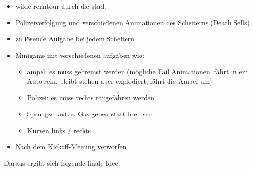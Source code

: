 \begin{enumerate}
	\begin{itemize}
		\item wilde renntour durch die stadt
		\item Polizeiverfolgung und verschiedenen Animationen des Scheiterns (Death Sells)
		\item zu lösende Aufgabe bei jedem Scheitern
		\item Minigame mit verschiedenen aufgaben wie:
		\begin{itemize}
			\item ampel: es muss gebremst werden (mögliche Fail Animationen, fährt in ein Auto rein, bleibt stehen aber explodiert, fährt die Ampel um)
			\item Polizei: es muss rechts rangefahren werden
			\item Sprungschantze: Gas geben statt bremsen
			\item Kurven links / rechts
		\end{itemize}
		\item Nach dem Kickoff-Meeting verworfen
	\end{itemize}
\end{enumerate}
Daraus ergibt sich folgende finale Idee:
